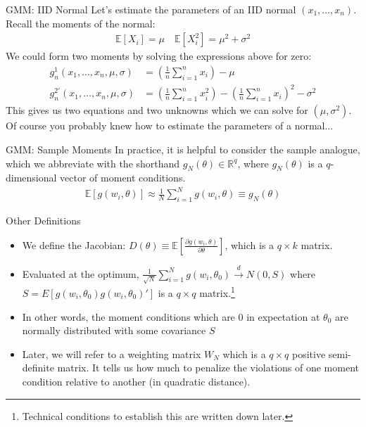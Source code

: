 \begin{frame}{GMM: IID Normal}
 Let's estimate the parameters of an IID normal $(x_1, \ldots, x_n)$. Recall the moments of the normal:
 \begin{align*}
 \mathbb{E}[X_i] = \mu \quad \mathbb{E}[X_i^2] = \mu^2 + \sigma^2
 \end{align*}
 We could form two moments by solving the expressions above for zero:
 \begin{align*}
 g_n^1(x_1,\ldots,x_n, \mu,\sigma)  &=  \left(\frac{1}{n} \sum_{i=1}^n x_i\right) - \mu\\
 g_n^{2'}(x_1,\ldots,x_n, \mu,\sigma)  &=  \left(\frac{1}{n} \sum_{i=1}^n x_i^2 \right) - \left(\frac{1}{n} \sum_{i=1}^n x_i\right)^2- \sigma^2
 \end{align*}
 This gives us two equations and two unknowns which we can solve for $(\mu,\sigma^2)$.\\
 Of course you probably knew how to estimate the parameters of a normal...
 \end{frame}
 
\begin{frame}{GMM: Sample Moments}
In practice, it is helpful to consider the sample analogue, which we abbreviate with the shorthand $g_N(\theta) \in \mathbb{R}^q$, where $g_N(\theta)$ is a $q$-dimensional vector of moment conditions.
\begin{eqnarray*}
\mathbb{E}[g(w_i, \theta )] \approx \frac{1}{N} \sum_{i=1}^N g(w_i, \theta)  \equiv g_N(\theta)
\end{eqnarray*}
\end{frame}

\begin{frame}{Other Definitions}
\begin{itemize}
\item We define the Jacobian: $D(\theta) \equiv \mathbb{E}[\frac{\partial g(w_i,\theta)}{\partial \theta}]$, which is a $q \times k$ matrix.
\item  Evaluated at the optimum, $\frac{1}{\sqrt{N}} \sum_{i=1}^N g(w_i,\theta_0) \overset{d}{\to} N(0,S)$ where $S = E[g(w_i,\theta_0) g(w_i,\theta_0)']$ is a $q \times q$ matrix.\footnote{Technical conditions to establish this are written down later.} 
\item In other words, the moment conditions which are $0$ in expectation at $\theta_0$ are normally distributed with some covariance $S$
\item Later, we will refer to a weighting matrix $W_N$ which is a $q \times q$ positive semi-definite matrix. It tells us how much to penalize the violations of one moment condition relative to another (in quadratic distance).
\end{itemize}
\end{frame}

